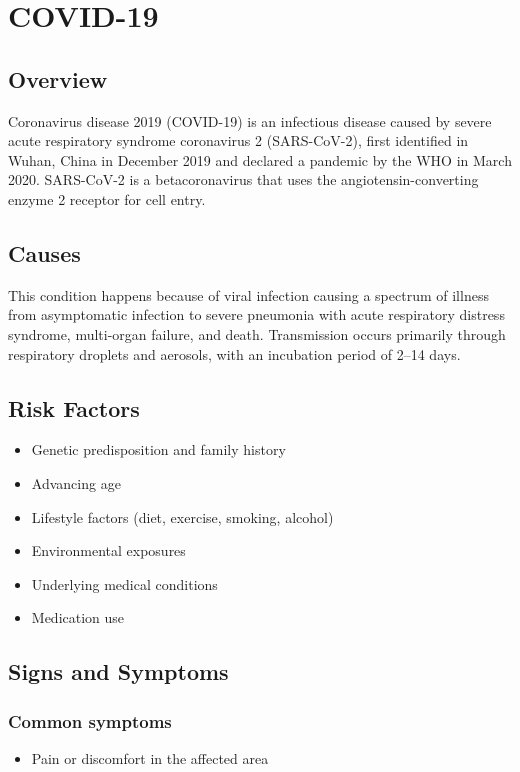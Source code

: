 \chapter{COVID-19}
\label{sec:COVID-19}

\section{Overview}
Coronavirus disease 2019 (COVID-19) is an infectious disease caused by severe acute respiratory syndrome coronavirus 2 (SARS-CoV-2), first identified in Wuhan, China in December 2019 and declared a pandemic by the WHO in March 2020. SARS-CoV-2 is a betacoronavirus that uses the angiotensin-converting enzyme 2 receptor for cell entry.
\section{Causes}
This condition happens because of viral infection causing a spectrum of illness from asymptomatic infection to severe pneumonia with acute respiratory distress syndrome, multi-organ failure, and death. Transmission occurs primarily through respiratory droplets and aerosols, with an incubation period of 2--14 days.     
\section{Risk Factors}

\begin{itemize}[noitemsep]
  \item Genetic predisposition and family history
  \item Advancing age
  \item Lifestyle factors (diet, exercise, smoking, alcohol)
  \item Environmental exposures
  \item Underlying medical conditions
  \item Medication use
\end{itemize}
\section{Signs and Symptoms}

\subsection{Common symptoms}
\begin{itemize}[noitemsep]
  \item Pain or discomfort in the affected area
  \end{itemize}


